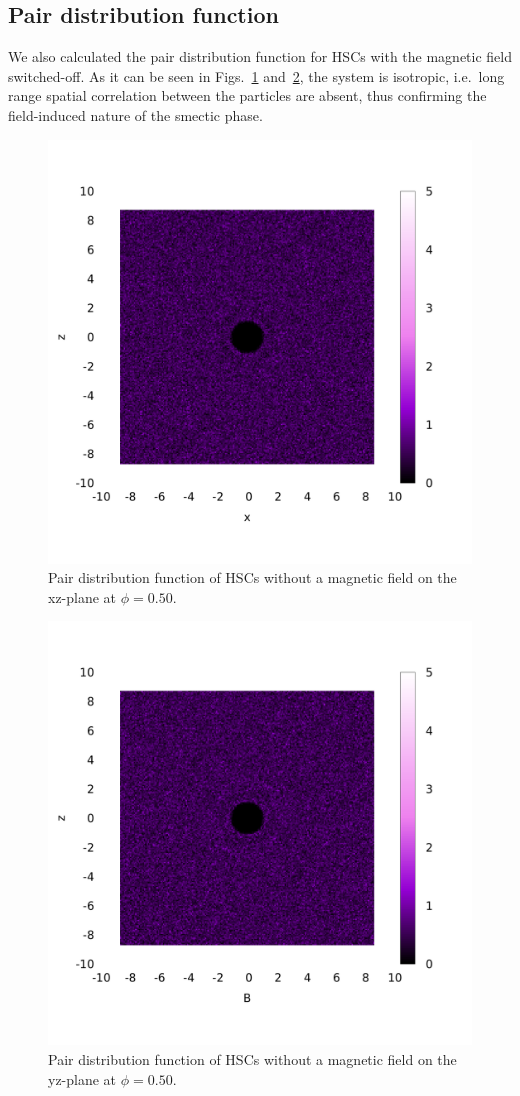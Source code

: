 \documentclass[aip,graphicx]{revtex4-1} %
\begin{document}
\subsection{Pair distribution function}

We also calculated the pair distribution function for HSCs with the magnetic field switched-off. 
As it can be seen in Figs.~\ref{fig:gxz_noB} and~\ref{fig:gyz_noB}, the system is isotropic, i.e.~long range
spatial correlation between the particles are absent, thus confirming the field-induced nature of the smectic phase.

\begin{figure}
    \centering
    \includegraphics[width=0.5\columnwidth]{gxz_noB.png}
    \caption{Pair distribution function of HSCs without a magnetic field on the xz-plane at $\phi=0.50$.}\label{fig:gxz_noB}
\end{figure}

\begin{figure}
    \centering
    \includegraphics[width=0.5\columnwidth]{gyz_noB.png}
    \caption{Pair distribution function of HSCs without a magnetic field on the yz-plane at $\phi=0.50$.}\label{fig:gyz_noB}
\end{figure}
\end{document}

